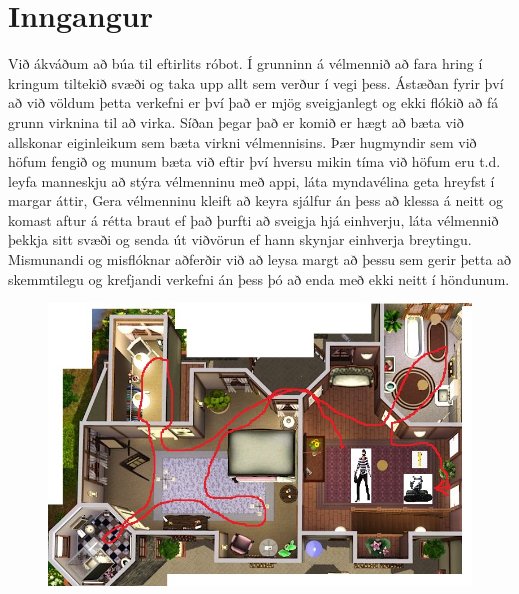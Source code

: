 \section{Inngangur}
Við ákváðum að búa til eftirlits róbot. Í grunninn á vélmennið að fara hring í kringum tiltekið
svæði og taka upp allt sem verður í vegi þess. Ástæðan fyrir því að við völdum þetta verkefni
er því það er mjög sveigjanlegt og ekki flókið að fá grunn virknina til að virka. Síðan þegar
það er komið er hægt að bæta við allskonar eiginleikum sem bæta virkni vélmennisins. Þær 
hugmyndir sem við höfum fengið og munum bæta við eftir því hversu mikin tíma við höfum eru t.d.
leyfa manneskju að stýra vélmenninu með appi, láta myndavélina geta hreyfst í margar áttir,
Gera vélmenninu kleift að keyra sjálfur án þess að klessa á neitt og komast aftur á rétta braut
ef það þurfti að sveigja hjá einhverju, láta vélmennið þekkja sitt svæði og senda út viðvörun
ef hann skynjar einhverja breytingu. Mismunandi og misflóknar aðferðir við að leysa margt að
þessu sem gerir þetta að skemmtilegu og krefjandi verkefni án þess þó að enda með ekki neitt
í höndunum. \cite{cite1}
\begin{figure}[h]
\includegraphics[scale=.4]{img/husmynd}
\end{figure}